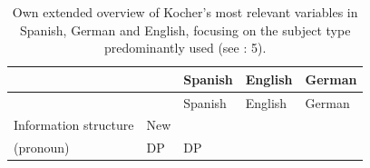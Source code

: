 \documentclass[
  letterpaper,
  DIV=11,
  numbers=noendperiod]{scrartcl}
\begin{document}
\begin{longtable}[]{@{}
  >{\raggedright\arraybackslash}p{}
  >{\raggedright\arraybackslash}p{}
  >{\raggedright\arraybackslash}p{}
  >{\raggedright\arraybackslash}p{}
  >{\raggedright\arraybackslash}p{}@{}}
\caption{Own extended overview of Kocher's most relevant variables in
Spanish, German and English, focusing on the subject type predominantly
used (see :
5).}\label{tbl-InfluentialFactors}\tabularnewline
\toprule\noalign{}
\begin{minipage}[b]{\linewidth}\raggedright
\end{minipage} & \begin{minipage}[b]{\linewidth}\raggedright
\end{minipage} & \begin{minipage}[b]{\linewidth}\raggedright
Spanish
\end{minipage} & \begin{minipage}[b]{\linewidth}\raggedright
English
\end{minipage} & \begin{minipage}[b]{\linewidth}\raggedright
German
\end{minipage} \\
\midrule\noalign{}
\endfirsthead
\toprule\noalign{}
\begin{minipage}[b]{\linewidth}\raggedright
\end{minipage} & \begin{minipage}[b]{\linewidth}\raggedright
\end{minipage} & \begin{minipage}[b]{\linewidth}\raggedright
Spanish
\end{minipage} & \begin{minipage}[b]{\linewidth}\raggedright
English
\end{minipage} & \begin{minipage}[b]{\linewidth}\raggedright
German
\end{minipage} \\
\midrule\noalign{}
\endhead
\bottomrule\noalign{}
\endlastfoot
Information structure & New &
\begin{minipage}[t]{\linewidth}\raggedright
DP,\\
(pronoun)\strut
\end{minipage} & DP & DP \\

\end{longtable}
\end{document}
